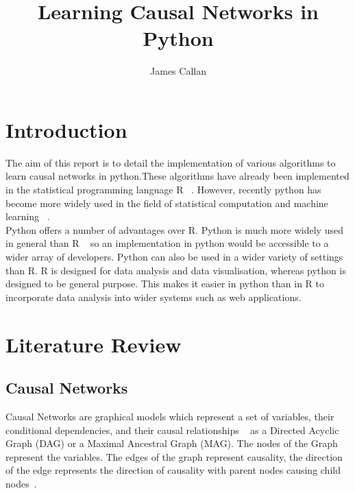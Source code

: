\documentclass{UoYCSproject}
\begin{document}
\title{Learning Causal Networks in Python}
\author{James Callan}
\MEng
\date{}

\maketitle

\listoffigures
\listoftables

\begin{summary}
\end{summary}
\chapter{Introduction}
The aim of this report is to detail the implementation of various algorithms to learn causal networks in python.These algorithms have already been implemented in the statistical programming language R ~\parencite{kalisch_hauser_maechler}. However, recently python has become more widely used in the field of statistical computation and machine learning ~\parencite{piatetsky}.\\

Python offers a number of advantages over R. Python is much more widely used in general than R ~\parencite{ogrady_2019} so an implementation in python would be accessible to a wider array of developers. Python can also be used in a wider variety of settings than R. R is designed for data analysis and data visualisation, whereas python is designed to be general purpose. This makes it easier in python than in R to incorporate data analysis into wider systems such as web applications.\\



\chapter{Literature Review}

\section{Causal Networks}

Causal Networks are graphical models which represent a set of variables, their conditional dependencies, and their causal relationships ~\parencite{verma1990causal} as a Directed Acyclic Graph (DAG) or a Maximal Ancestral Graph (MAG). The nodes of the Graph represent the variables. The edges of the graph represent causality, the direction of the edge represents the direction of causality with parent nodes causing child nodes~\parencite{verma1990causal}. 
\end{document}
